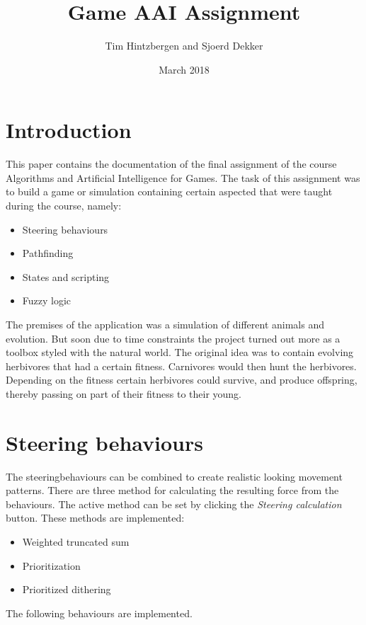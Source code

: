 \documentclass[10pt]{extarticle} %
\title{Game AAI Assignment}
\author{Tim Hintzbergen and Sjoerd Dekker}
\date{March 2018}
\begin{document}
   \maketitle
   \thispagestyle{empty}
   \newpage
   \newpage
   \setcounter{page}{1}
   \section {Introduction}
   This paper contains the documentation of the final assignment of the course Algorithms and Artificial Intelligence for Games. The task of this assignment was to build a game or simulation containing certain aspected that were taught during the course, namely:
   \begin{itemize}
      \item Steering behaviours
      \item Pathfinding
      \item States and scripting
      \item Fuzzy logic
   \end{itemize}
   The premises of the application was a simulation of different animals and evolution. But soon due to time constraints the project turned out more as a toolbox styled with the natural world. The original idea was to contain evolving herbivores that had a certain fitness. Carnivores would then hunt the herbivores. Depending on the fitness certain herbivores could survive, and produce offspring, thereby passing on part of their fitness to their young.
   \newpage

   \tableofcontents{}
   \newpage
   \section{Steering behaviours}
   The steeringbehaviours can be combined to create realistic looking movement patterns. There are three method for calculating the resulting force from the behaviours. The active method can be set by clicking the \emph{Steering calculation} button. These methods are implemented:
   \begin{itemize}
   \item Weighted truncated sum
   \item Prioritization
   \item Prioritized dithering
   \end{itemize}
   The following behaviours are implemented.
\end{document}
